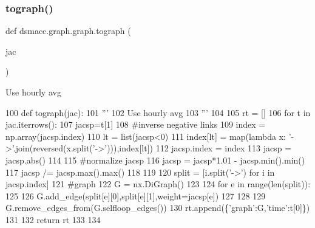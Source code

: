 \subsubsection{\texorpdfstring{tograph()}{tograph()}}
{\footnotesize\ttfamily def dsmacc.\+graph.\+graph.\+tograph (\begin{DoxyParamCaption}\item[{}]{jac }\end{DoxyParamCaption})}

\begin{DoxyVerb}Use hourly avg
\end{DoxyVerb}
 
\begin{DoxyCode}
100 \textcolor{keyword}{def }tograph(jac):
101     \textcolor{stringliteral}{'''}
102 \textcolor{stringliteral}{    Use hourly avg}
103 \textcolor{stringliteral}{    '''}
104 
105     rt = []
106     \textcolor{keywordflow}{for} t \textcolor{keywordflow}{in} jac.iterrows():
107         jacsp=t[1]
108         \textcolor{comment}{#inverse negative links}
109         index = np.array(jacsp.index)
110         lt = list(jacsp<0)
111         index[lt] = map(\textcolor{keyword}{lambda} x: \textcolor{stringliteral}{'->'}.join(reversed(x.split(\textcolor{stringliteral}{'->'}))),index[lt])
112         jacsp.index = index
113         jacsp = jacsp.abs()
114 
115         \textcolor{comment}{#normalize jacsp}
116         jacsp  = jacsp*1.01 - jacsp.min().min()
117         jacsp /= jacsp.max().max()
118 
119 
120         split = [i.split(\textcolor{stringliteral}{'->'}) \textcolor{keywordflow}{for} i \textcolor{keywordflow}{in} jacsp.index]
121         \textcolor{comment}{#graph}
122         G = nx.DiGraph()
123 
124         \textcolor{keywordflow}{for} e \textcolor{keywordflow}{in} range(len(split)):
125 
126             G.add\_edge(split[e][0],split[e][1],weight=jacsp[e])
127 
128 
129         G.remove\_edges\_from(G.selfloop\_edges())
130         rt.append(\{\textcolor{stringliteral}{'graph'}:G,\textcolor{stringliteral}{'time'}:t[0]\})
131 
132     \textcolor{keywordflow}{return} rt
133 
134 
\end{DoxyCode}
